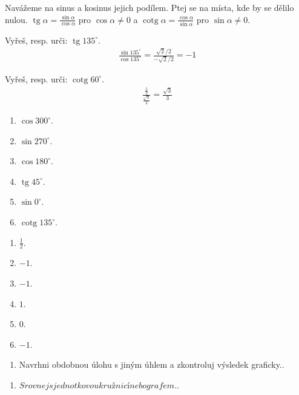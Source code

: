 \documentclass[11pt,a4paper]{article}
\begin{document}
Navážeme na sinus a kosinus jejich podílem. Ptej se na místa, kde by se dělilo nulou.
$\operatorname{tg}\alpha=\frac{\sin\alpha}{\cos\alpha}$ pro $\cos\alpha\ne0$ a $\operatorname{cotg}\alpha=\frac{\cos\alpha}{\sin\alpha}$ pro $\sin\alpha\ne0$.
\begin{prikladReseniBox}[title={Příklad 1}]
Vyřeš, resp. urči: $\operatorname{tg}135^\circ$.
\tcblower
\[\begin{aligned}\frac{\sin135^\circ}{\cos135^\circ}=\frac{\sqrt2/2}{-\sqrt2/2}=-1\end{aligned}\]
\end{prikladReseniBox}
\begin{prikladReseniBox}[title={Příklad 2}]
Vyřeš, resp. urči: $\operatorname{cotg}60^\circ$.
\tcblower
\[\begin{aligned}\frac{\frac{1}{2}}{\frac{\sqrt3}{2}}=\frac{\sqrt3}{3}\end{aligned}\]
\end{prikladReseniBox}
\begin{zadaniReseniBox}[title={Samostatná práce 1}]
\begin{enumerate}[label=\alph*)]
\item $\cos300^\circ$.
\item $\sin270^\circ$.
\item $\cos180^\circ$.
\item $\operatorname{tg}45^\circ$.
\item $\sin0^\circ$.
\item $\operatorname{cotg}135^\circ$.
\end{enumerate}
\tcblower
\begin{enumerate}[label=\alph*)]
\item $\frac{1}{2}$.
\item $-1$.
\item $-1$.
\item $1$.
\item $0$.
\item $-1$.
\end{enumerate}
\end{zadaniReseniBox}
\begin{zadaniReseniBox}[title={Rozšíření 1}]
\begin{enumerate}[label=\alph*)]
\item Navrhni obdobnou úlohu s jiným úhlem a zkontroluj výsledek graficky..
\end{enumerate}
\tcblower
\begin{enumerate}[label=\alph*)]
\item $Srovnej s jednotkovou kružnicí nebo grafem.$.
\end{enumerate}
\end{zadaniReseniBox}
\end{document}
